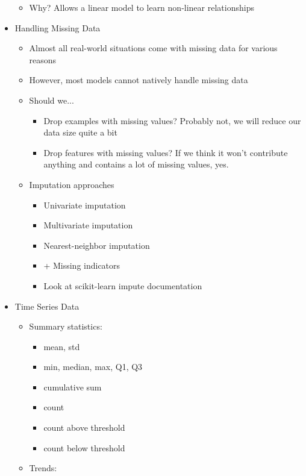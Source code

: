 \documentclass[10pt, oneside]{article}
\begin{document}
\begin{itemize}
\begin{itemize}
        \item Why? Allows a linear model to learn non-linear relationships
    \end{itemize}
    \item Handling Missing Data
    \begin{itemize}
        \item Almost all real-world situations come with missing data for various reasons
        \item However, most models cannot natively handle missing data
        \item Should we...
        \begin{itemize}
            \item Drop examples with missing values? Probably not, we will reduce our data size quite a bit
            \item Drop features with missing values? If we think it won't contribute anything and contains a lot of missing values, yes.
        \end{itemize}
        \item Imputation approaches
        \begin{itemize}
            \item Univariate imputation
            \item Multivariate imputation
            \item Nearest-neighbor imputation
            \item + Missing indicators
            \item Look at scikit-learn impute documentation
        \end{itemize}
    \end{itemize}
    \item Time Series Data
    \begin{itemize}
        \item Summary statistics:
        \begin{itemize}
            \item mean, std
            \item min, median, max, Q1, Q3
            \item cumulative sum
            \item count
            \item count above threshold
            \item count below threshold
        \end{itemize}
        \item Trends:
        \begin{itemize}

\end{itemize}
\end{itemize}
\end{itemize}
\end{document}
